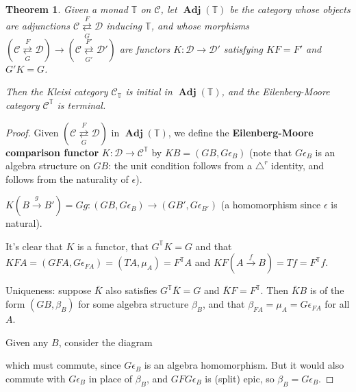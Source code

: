 \documentclass[a4paper]{article}
\newtheorem{theorem}[definition]{Theorem}
\numberwithin{definition}{section}
\newcommand*\circbox[1]{\raisebox{.5pt}{\textcircled{\raisebox{-.9pt} {#1}}}}
\DeclareMathOperator{\Adj}{\textbf{Adj}}
\begin{document}
\begin{theorem}
	Given a monad $\mathbb{T}$ on $\mathcal{C}$,
	let $\Adj(\mathbb{T})$ be the category whose objects are adjunctions $\mathcal{C}\underset{G}{\overset{F}{\rightleftarrows}} \mathcal{D}$ inducing $\mathbb{T}$,
	and whose morphisms $(\mathcal{C}\underset{G}{\overset{F}{\rightleftarrows}} \mathcal{D}) \to (\mathcal{C}\underset{G'}{\overset{F'}{\rightleftarrows}} \mathcal{D}')$
	are functors $K: \mathcal{D} \to \mathcal{D}'$ satisfying $KF=F'$ and $G'K=G$.
	
	Then the Kleisi category $\mathcal{C}_\mathbb{T}$ is initial in $\Adj(\mathbb{T})$,
	and the Eilenberg-Moore category $\mathcal{C}^\mathbb{T}$ is terminal.
\end{theorem}
\begin{proof}
	Given $(\mathcal{C}\underset{G}{\overset{F}{\rightleftarrows}} \mathcal{D})$ in $\Adj(\mathbb{T})$,
	we define the \textbf{Eilenberg-Moore comparison functor} $K: \mathcal{D} \to \mathcal{C}^\mathbb{T}$
	by $KB=(GB, G\epsilon_B)$
	(note that $G\epsilon_B$ is an algebra structure on $GB$:
	the unit condition \circbox{4} follows from a $\triangle^r$ identity,
	and \circbox{5} follows from the naturality of $\epsilon$).
	
	$K(B \overset{g}{\to} B') = Gg: (GB, G\epsilon_B) \to (GB', G\epsilon_{B'})$
	(a homomorphism since $\epsilon$ is natural).
	
	It's clear that $K$ is a functor,
	that $G^\mathbb{T}K=G$ and that $KFA = (GFA, G\epsilon_{FA}) = (TA, \mu_A) = F^\mathbb{T}A$ and $KF(A \overset{f}{\to} B) = Tf = F^\mathbb{T}f$.
	
	Uniqueness: suppose $\bar{K}$ also satisfies $G^\mathbb{T}\bar{K} = G$ and $\bar{K}F = F^\mathbb{T}$.
	Then $\bar{K}B$ is of the form $(GB, \beta_B)$ for some algebra structure $\beta_B$,
	and that $\beta_{FA} = \mu_A = G\epsilon_{FA}$ for all $A$.
	
	Given any $B$, consider the diagram
	\begin{center}
	\end{center}
	which must commute, since $G\epsilon_B$ is an algebra homomorphism.
	But it would also commute with $G\epsilon_B$ in place of $\beta_B$,
	and $GFG\epsilon_B$ is (split) epic,
	so $\beta_B = G\epsilon_B$.
	

\end{proof}
\end{document}

